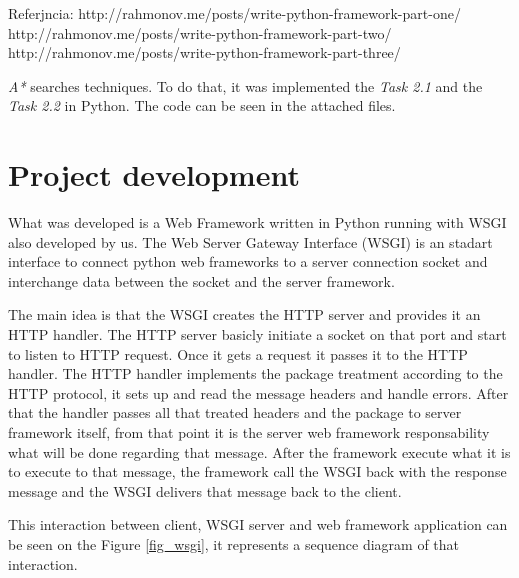 \documentclass[journal,12pt,onecolumn,draftclsnofoot,]{IEEEtran}
\begin{document}
Referjncia:
http://rahmonov.me/posts/write-python-framework-part-one/
http://rahmonov.me/posts/write-python-framework-part-two/
http://rahmonov.me/posts/write-python-framework-part-three/


 \textit{A*} searches techniques. To do that, it was implemented the \textit{Task 2.1} and the \textit{Task 2.2} in Python. The code can be seen in the attached files.

\section{Project development}
What was developed is a Web Framework written in Python running with WSGI also developed by us. The Web Server Gateway Interface (WSGI) is an stadart interface to connect python web frameworks to a server connection socket and interchange data between the socket and the server framework.

The main idea is that the WSGI creates the HTTP server and provides it an HTTP handler. The HTTP server basicly initiate a socket on that port and start to listen to HTTP request. Once it gets a request it passes it to the HTTP handler. The HTTP handler implements the package treatment according to the HTTP protocol, it sets up and read the message headers and handle errors. After that the handler passes all that treated headers and the package to server framework itself, from that point it is the server web framework responsability what will be done regarding that message. After the framework execute what it is to execute to that message, the framework call the WSGI back with the response message and the WSGI delivers that message back to the client.

This interaction between client, WSGI server and web framework application can be seen on the Figure \ref{fig_wsgi}, it represents a sequence diagram of that interaction.
\end{document}
